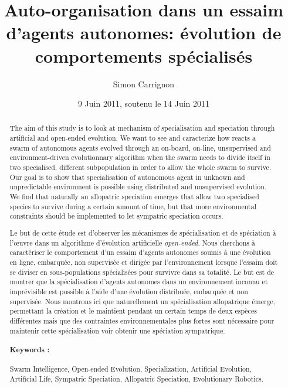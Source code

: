 \documentclass[a4paper,10pt]{report}
\title{Auto-organisation dans un essaim d'agents autonomes: évolution de comportements spécialisés}
\author{Simon Carrignon}
\date{9 Juin 2011, soutenu le 14 Juin 2011}
\begin{document}
\renewcommand{\abstractname}{Abstract/Résumé}

\tableofcontents

\listoffigures


\begin{abstract}
The aim of this study is to look at mechanism of specialisation and speciation through artificial and open-ended evolution. We want to see and caracterize how reacts a swarm of autonomous agents evolved through an on-board, on-line, unsupervised and environment-driven evolutionnary algorithm when the swarm needs to divide itself in two specialised, different subpopulation in order to allow the whole swarm to survive. Our goal is to show that specialisation of autonomous agent in unknown and unpredictable environment is possible using distributed and unsupervised evolution. We find that naturally an allopatric speciation emerges that allow two specialised species to survive during a certain amount of time, but that more environmental constraints should be implemented  to let sympatric speciation occurs. 

Le but de cette étude est d'observer les mécanismes de spécialisation et de spéciation à l'\oe uvre dans un algorithme d'évolution artificielle \emph{open-ended}. Nous cherchons à caractériser le comportement d'un essaim d'agents autonomes soumis à une évolution en ligne, embarquée, non supervisée et dirigée par l'environnement lorsque l'essaim doit se diviser en sous-populations spécialisées pour survivre dans sa totalité. Le but est de montrer que la spécialisation d'agents autonomes dans un environnement inconnu et imprévisible est possible à l'aide d'une évolution distribuée, embarquée et non supervisée. Nous montrons ici que naturellement un spécialisation allopatrique émerge, permettant la création et le maintient pendant un certain temps de deux espèces différentes mais que des contraintes environnementales plus fortes sont nécessaire pour maintenir cette spécialisation voir obtenir une spéciation sympatrique. 

\begin{itshape}
\paragraph{Keywords :}
Swarm Intelligence, Open-ended Evolution, Specialization, Artificial Evolution, Artificial Life, Sympatric Speciation, Allopatric Speciation, Evolutionary Robotics.

\end{itshape}

\end{abstract}
\end{document}
